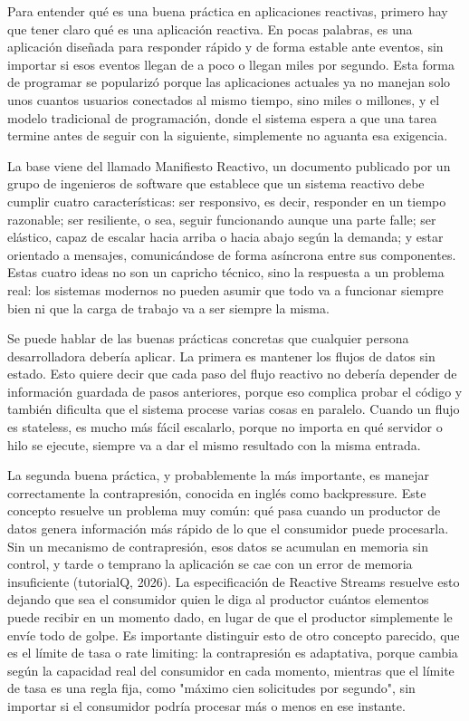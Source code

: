 \documentclass[12pt,letterpaper]{article}
\begin{document}
Para entender qué es una buena práctica en aplicaciones reactivas, primero hay que tener claro qué es una aplicación reactiva. En pocas palabras, es una aplicación diseñada para responder rápido y de forma estable ante eventos, sin importar si esos eventos llegan de a poco o llegan miles por segundo. Esta forma de programar se popularizó porque las aplicaciones actuales ya no manejan solo unos cuantos usuarios conectados al mismo tiempo, sino miles o millones, y el modelo tradicional de programación, donde el sistema espera a que una tarea termine antes de seguir con la siguiente, simplemente no aguanta esa exigencia.

La base viene del llamado Manifiesto Reactivo, un documento publicado por un grupo de ingenieros de software que establece que un sistema reactivo debe cumplir cuatro características: ser responsivo, es decir, responder en un tiempo razonable; ser resiliente, o sea, seguir funcionando aunque una parte falle; ser elástico, capaz de escalar hacia arriba o hacia abajo según la demanda; y estar orientado a mensajes, comunicándose de forma asíncrona entre sus componentes. Estas cuatro ideas no son un capricho técnico, sino la respuesta a un problema real: los sistemas modernos no pueden asumir que todo va a funcionar siempre bien ni que la carga de trabajo va a ser siempre la misma.

Se puede hablar de las buenas prácticas concretas que cualquier persona desarrolladora debería aplicar. La primera es mantener los flujos de datos sin estado. Esto quiere decir que cada paso del flujo reactivo no debería depender de información guardada de pasos anteriores, porque eso complica probar el código y también dificulta que el sistema procese varias cosas en paralelo. Cuando un flujo es stateless, es mucho más fácil escalarlo, porque no importa en qué servidor o hilo se ejecute, siempre va a dar el mismo resultado con la misma entrada.

La segunda buena práctica, y probablemente la más importante, es manejar correctamente la contrapresión, conocida en inglés como backpressure. Este concepto resuelve un problema muy común: qué pasa cuando un productor de datos genera información más rápido de lo que el consumidor puede procesarla. Sin un mecanismo de contrapresión, esos datos se acumulan en memoria sin control, y tarde o temprano la aplicación se cae con un error de memoria insuficiente (tutorialQ, 2026). La especificación de Reactive Streams resuelve esto dejando que sea el consumidor quien le diga al productor cuántos elementos puede recibir en un momento dado, en lugar de que el productor simplemente le envíe todo de golpe. Es importante distinguir esto de otro concepto parecido, que es el límite de tasa o rate limiting: la contrapresión es adaptativa, porque cambia según la capacidad real del consumidor en cada momento, mientras que el límite de tasa es una regla fija, como "máximo cien solicitudes por segundo", sin importar si el consumidor podría procesar más o menos en ese instante.
\end{document}
